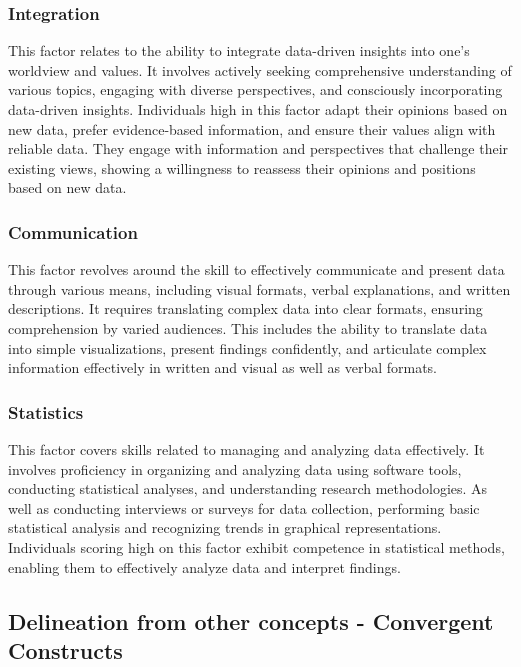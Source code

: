 \documentclass[
  12pt,
  a4paper,
  twoside]{article}
\begin{document}
\subsubsection{Integration}\label{integration}

This factor relates to the ability to integrate data-driven insights into one's worldview and values. It involves actively seeking comprehensive understanding of various topics, engaging with diverse perspectives, and consciously incorporating data-driven insights. Individuals high in this factor adapt their opinions based on new data, prefer evidence-based information, and ensure their values align with reliable data. They engage with information and perspectives that challenge their existing views, showing a willingness to reassess their opinions and positions based on new data.

\subsubsection{Communication}\label{communication}

This factor revolves around the skill to effectively communicate and present data through various means, including visual formats, verbal explanations, and written descriptions.
It requires translating complex data into clear formats, ensuring comprehension by varied audiences. This includes the ability to translate data into simple visualizations, present findings confidently, and articulate complex information effectively in written and visual as well as verbal formats.

\subsubsection{Statistics}\label{statistics}

This factor covers skills related to managing and analyzing data effectively. It involves proficiency in organizing and analyzing data using software tools, conducting statistical analyses, and understanding research methodologies.
As well as conducting interviews or surveys for data collection, performing basic statistical analysis and recognizing trends in graphical representations. Individuals scoring high on this factor exhibit competence in statistical methods, enabling them to effectively analyze data and interpret findings.

\subsection{Delineation from other concepts - Convergent Constructs}\label{delineation-from-other-concepts---convergent-constructs}
\end{document}
